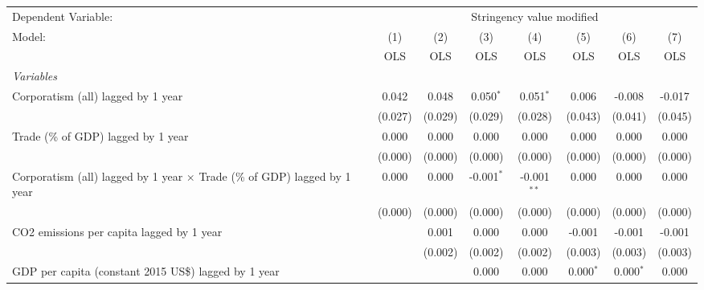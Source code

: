 
\begingroup
\centering
\begin{tabular}{lccccccc}
   \toprule
   Dependent Variable: & \multicolumn{7}{c}{Stringency value modified}\\
   Model:                                                                           & (1)     & (2)     & (3)          & (4)           & (5)         & (6)          & (7)\\  
                                                                                    &  OLS    & OLS     & OLS          & OLS           & OLS         & OLS          & OLS\\  
   \midrule
   \emph{Variables}\\
   Corporatism (all) lagged by 1 year                                               & 0.042   & 0.048   & 0.050$^{*}$  & 0.051$^{*}$   & 0.006       & -0.008       & -0.017\\   
                                                                                    & (0.027) & (0.029) & (0.029)      & (0.028)       & (0.043)     & (0.041)      & (0.045)\\   
   Trade (\% of GDP) lagged by 1 year                                               & 0.000   & 0.000   & 0.000        & 0.000         & 0.000       & 0.000        & 0.000\\   
                                                                                    & (0.000) & (0.000) & (0.000)      & (0.000)       & (0.000)     & (0.000)      & (0.000)\\   
   Corporatism (all) lagged by 1 year $\times$ Trade (\% of GDP) lagged by 1 year   & 0.000   & 0.000   & -0.001$^{*}$ & -0.001$^{**}$ & 0.000       & 0.000        & 0.000\\   
                                                                                    & (0.000) & (0.000) & (0.000)      & (0.000)       & (0.000)     & (0.000)      & (0.000)\\   
   CO2 emissions per capita lagged by 1 year                                        &         & 0.001   & 0.000        & 0.000         & -0.001      & -0.001       & -0.001\\   
                                                                                    &         & (0.002) & (0.002)      & (0.002)       & (0.003)     & (0.003)      & (0.003)\\   
   GDP per capita (constant 2015 US\$) lagged by 1 year                             &         &         & 0.000        & 0.000         & 0.000$^{*}$ & 0.000$^{*}$  & 0.000\\   

\end{tabular}
